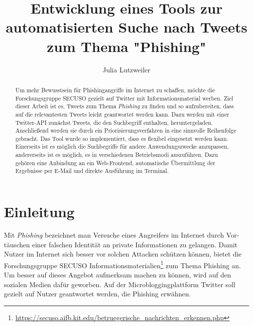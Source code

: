\documentclass[runningheads]{llncs}
\begin{document}
%
\title{Entwicklung eines Tools zur automatisierten Suche nach Tweets zum Thema "Phishing"}
%
%
\author{Julia Lutzweiler}
%
%
%
\maketitle              %
%
\begin{abstract}
Um mehr Bewusstsein für Phishingangriffe im Internet zu schaffen, möchte die Forschungsgruppe SECUSO gezielt auf Twitter mit Informationsmaterial werben.
Ziel dieser Arbeit ist es, Tweets zum Thema \textit{Phishing} zu finden und so aufzubereiten, dass auf die relevantesten Tweets leicht geantwortet werden kann.
Dazu werden mit einer Twitter-API zunächst Tweets, die den Suchbegriff enthalten, heruntergeladen.
Anschließend werden sie durch ein Priorisierungsverfahren in eine sinnvolle Reihenfolge gebracht.
Das Tool wurde so implementiert, dass es flexibel eingesetzt werden kann.
Einerseits ist es möglich die Suchbegriffe für andere Anwendungszwecke anzupassen, andererseits ist es möglich, es in verschiedenen Betriebsmodi auszuführen.
Dazu gehören eine Anbindung an ein Web-Frontend, automatische Übermittlung der Ergebnisse per E-Mail und direkte Ausführung im Terminal.
\end{abstract}


\section{Einleitung}
Mit \textit{Phishing} bezeichnet man Versuche eines Angreifers im Internet durch Vor-täuschen einer falschen Identität an private Informationen zu gelangen\cite{definition}.
Damit Nutzer im Internet sich besser vor solchen Attacken schützen können, bietet die Forschungsgruppe SECUSO Informationsmaterialien\footnote{\url{https://secuso.aifb.kit.edu/betruegerische_nachrichten_erkennen.php}} zum Thema Phishing an.
Um besser auf dieses Angebot aufmerksam machen zu können, wird auf den sozialen Medien dafür geworben.
Auf der Microbloggingplattform Twitter soll gezielt auf Nutzer geantwortet werden, die Phishing erwähnen.
\end{document}

